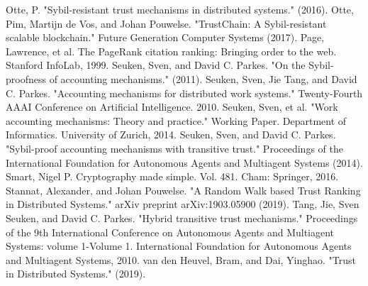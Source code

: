 \documentclass[11pt,a4paper]{report}
\theoremstyle{definition}
\theoremstyle{theorem}
\theoremstyle{proposition}
\theoremstyle{corollary}
\theoremstyle{lemma}
\theoremstyle{example}
\theoremstyle{remark}
\begin{document}
\begin{thebibliography}{9}
Otte, P. "Sybil-resistant trust mechanisms in distributed systems." (2016).
Otte, Pim, Martijn de Vos, and Johan Pouwelse. "TrustChain: A Sybil-resistant scalable blockchain." Future Generation Computer Systems (2017).
Page, Lawrence, et al. The PageRank citation ranking: Bringing order to the web. Stanford InfoLab, 1999. 
Seuken, Sven, and David C. Parkes. "On the Sybil-proofness of accounting mechanisms." (2011).
Seuken, Sven, Jie Tang, and David C. Parkes. "Accounting mechanisms for distributed work systems." Twenty-Fourth AAAI Conference on Artificial Intelligence. 2010.
Seuken, Sven, et al. "Work accounting mechanisms: Theory and practice." Working Paper. Department of Informatics. University of Zurich, 2014.
Seuken, Sven, and David C. Parkes. "Sybil-proof accounting mechanisms with transitive trust." Proceedings of the International Foundation for Autonomous Agents and Multiagent Systems (2014).
Smart, Nigel P. Cryptography made simple. Vol. 481. Cham: Springer, 2016.
Stannat, Alexander, and Johan Pouwelse. "A Random Walk based Trust Ranking in Distributed Systems." arXiv preprint arXiv:1903.05900 (2019).
Tang, Jie, Sven Seuken, and David C. Parkes. "Hybrid transitive trust mechanisms." Proceedings of the 9th International Conference on Autonomous Agents and Multiagent Systems: volume 1-Volume 1. International Foundation for Autonomous Agents and Multiagent Systems, 2010.
van den Heuvel, Bram, and Dai, Yinghao. "Trust in Distributed Systems." (2019).  





\end{thebibliography}
\end{document}

